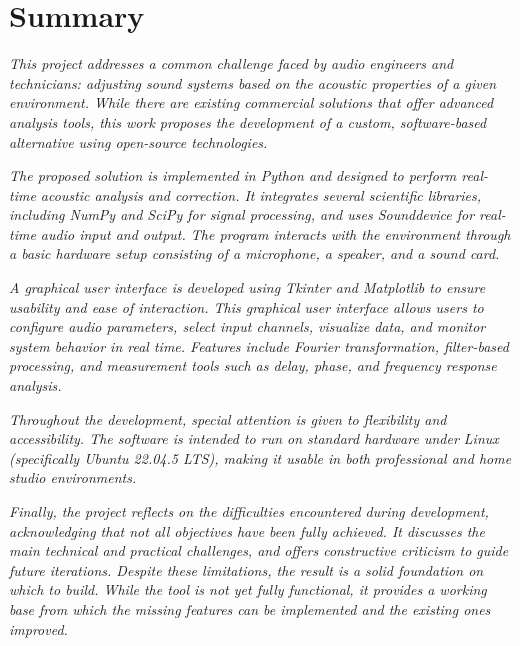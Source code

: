 \chapter*{Summary}




\textit{This project addresses a common challenge faced by audio engineers and technicians: adjusting sound systems based on the acoustic properties of a given environment. While there are existing commercial solutions that offer advanced analysis tools, this work proposes the development of a custom, software-based alternative using open-source technologies.}
	
\textit{The proposed solution is implemented in Python and designed to perform real-time acoustic analysis and correction. It integrates several scientific libraries, including NumPy and SciPy for signal processing, and uses Sounddevice for real-time audio input and output. The program interacts with the environment through a basic hardware setup consisting of a microphone, a speaker, and a sound card.}
	
\textit{A graphical user interface is developed using Tkinter and Matplotlib to ensure usability and ease of interaction. This graphical user interface allows users to configure audio parameters, select input channels, visualize data, and monitor system behavior in real time. Features include Fourier transformation, filter-based processing, and measurement tools such as delay, phase, and frequency response analysis.}
	
\textit{Throughout the development, special attention is given to flexibility and accessibility. The software is intended to run on standard hardware under Linux (specifically Ubuntu 22.04.5 LTS), making it usable in both professional and home studio environments.}

\textit{Finally, the project reflects on the difficulties encountered during development, acknowledging that not all objectives have been fully achieved. It discusses the main technical and practical challenges, and offers constructive criticism to guide future iterations. Despite these limitations, the result is a solid foundation on which to build. While the tool is not yet fully functional, it provides a working base from which the missing features can be implemented and the existing ones improved.}